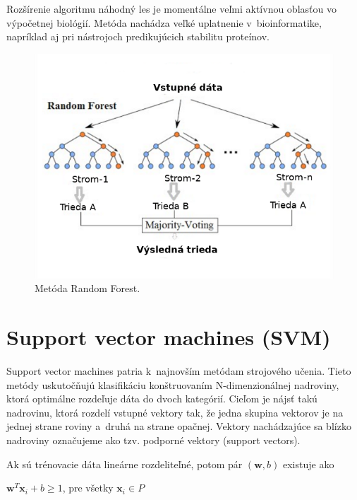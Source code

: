 Rozšírenie algoritmu náhodný les je momentálne veľmi aktívnou oblasťou vo výpočetnej biológií. Metóda nachádza veľké uplatnenie v~bioinformatike, napríklad aj pri nástrojoch predikujúcich stabilitu proteínov.

\begin{figure}[H]
	\centering
	\begin{center}
		\scalebox{0.8}
		{   
			\includegraphics{rf.png}
			
		}
		\caption[Random Forest]{Metóda Random Forest\footnotemark.}
		\label{random_forest}
	\end{center}
\end{figure}

\section {Support vector machines (SVM)}

Support vector machines patria k~najnovším metódam strojového učenia. Tieto metódy uskutočňujú klasifikáciu konštruovaním N-dimenzionálnej nadroviny, ktorá optimálne rozdeľuje dáta do dvoch kategórií. Cieľom je nájsť takú nadrovinu, ktorá rozdelí vstupné vektory tak, že jedna skupina vektorov je na jednej strane roviny a~druhá na strane opačnej. Vektory nachádzajúce sa blízko nadroviny označujeme ako tzv. podporné vektory (support vectors). 

Ak sú trénovacie dáta lineárne rozdeliteľné, potom pár $(\textbf{w},b)$ existuje ako 

	$\textbf{w}^{T}\textbf{x}_{i} + b \geq 1$, pre všetky $\textbf{x}_{i} \in P$
	
